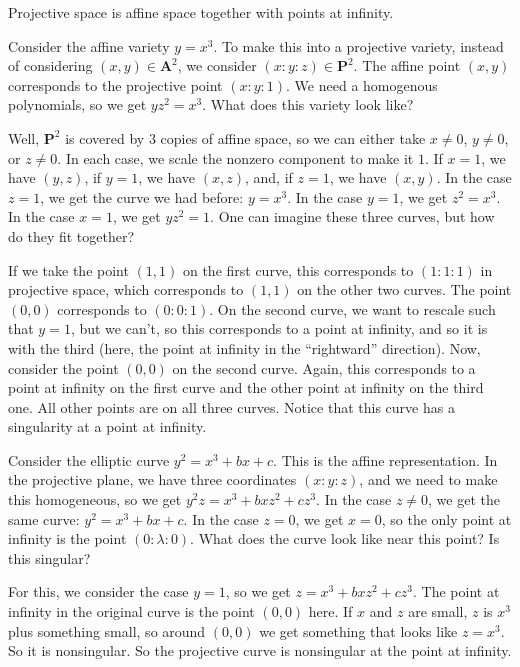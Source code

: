 \documentclass[11pt, oneside,margin=1in]{article}
\begin{document}
Projective space is affine space together with points at infinity.
\begin{example}[ ]\label{}\text{}
Consider the affine variety $y=x^3$. To make this into a projective variety, instead of considering $(x,y) \in \mathbf{A}^2$, we consider $(x:y:z)\in \mathbf{P}^2$. The affine point $(x,y)$ corresponds to the projective point $(x:y:1)$. We need a homogenous polynomials, so we get $yz^2 = x^3$. What does this variety look like?

Well, $\mathbf{P}^2$ is covered by $3$ copies of affine space, so we can either take $x\ne 0$, $y\ne 0$, or $z\ne 0$. In each case, we scale the nonzero component to make it $1$. If $x=1$, we have $(y,z)$, if $y=1$, we have $(x,z)$, and, if $z=1$, we have $(x,y)$. In the case $z=1$, we get the curve we had before: $y=x^3$. In the case $y=1$, we get $z^2 = x^3$. In the case $x=1$, we get $yz^2 = 1$. One can imagine these three curves, but how do they fit together? 

If we take the point $(1,1)$ on the first curve, this corresponds to $(1:1:1)$ in projective space, which corresponds to $(1,1)$ on the other two curves. The point $(0,0)$ corresponds to $(0:0:1)$. On the second curve, we want to rescale such that $y=1$, but we can't, so this corresponds to a point at infinity, and so it is with the third (here, the point at infinity in the ``rightward'' direction). Now, consider the point $(0,0)$ on the second curve. Again, this corresponds to a point at infinity on the first curve and the other point at infinity on the third one. All other points are on all three curves. Notice that this curve has a singularity at a point at infinity.
\end{example}

\begin{example}[ ]\label{}\text{}
Consider the elliptic curve $y^2 = x^3+bx+c$. This is the affine representation. In the projective plane, we have three coordinates $(x:y:z)$, and we need to make this homogeneous, so we get $y^2z = x^3 + bxz^2 + cz^3$. In the case $z\ne 0$, we get the same curve: $y^2 = x^3 + bx + c$. In the case $z=0$, we get $x=0$, so the only point at infinity is the point $(0:\lambda:0)$. What does the curve look like near this point? Is this singular?

For this, we consider the case $y=1$, so we get $z = x^3 + bxz^2 + cz^3$. The point at infinity in the original curve is the point $(0,0)$ here. If $x$ and $z$ are small, $z$ is $x^3$ plus something small, so around $(0,0)$ we get something that looks like $z=x^3$. So it is nonsingular. So the projective curve is nonsingular at the point at infinity.
\end{example}
\end{document}

